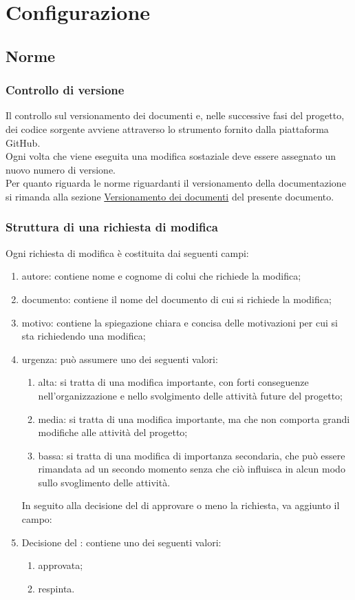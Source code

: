 \section{Configurazione}
	\subsection{Norme}
		\subsubsection{Controllo di versione}
		Il controllo sul versionamento dei documenti e, nelle successive fasi del progetto, dei codice sorgente avviene attraverso lo strumento fornito dalla piattaforma GitHub.\\
		Ogni volta che viene eseguita una modifica sostaziale deve essere assegnato un nuovo numero di versione.\\
		Per quanto riguarda le norme riguardanti il versionamento della documentazione si rimanda alla sezione \hyperref[sec:versioni]{Versionamento dei documenti} del presente documento.
		\subsubsection{Struttura di una richiesta di modifica}
			Ogni richiesta di modifica è costituita dai seguenti campi:
			\begin{enumerate}
				\item autore: contiene nome e cognome di colui che richiede la modifica;
				\item documento: contiene il nome del documento di cui si richiede la modifica;
				\item motivo: contiene la spiegazione chiara e concisa delle motivazioni per cui si sta richiedendo una modifica;
				\item urgenza: può assumere uno dei seguenti valori:
					\begin{enumerate}
						\item alta: si tratta di una modifica importante, con forti conseguenze nell'organizzazione e nello svolgimento delle attività future del progetto;
						\item media: si tratta di una modifica importante, ma che non comporta grandi modifiche alle attività del progetto;
						\item bassa: si tratta di una modifica di importanza secondaria, che può essere rimandata ad un secondo momento senza che ciò influisca in alcun modo sullo svoglimento delle attività.
					\end{enumerate}
			In seguito alla decisione del  di approvare o meno la richiesta, va aggiunto il campo:
				\item Decisione del : contiene uno dei seguenti valori:
					\begin{enumerate}
						\item approvata;
						\item respinta.
					\end{enumerate}
			\end{enumerate}
	
